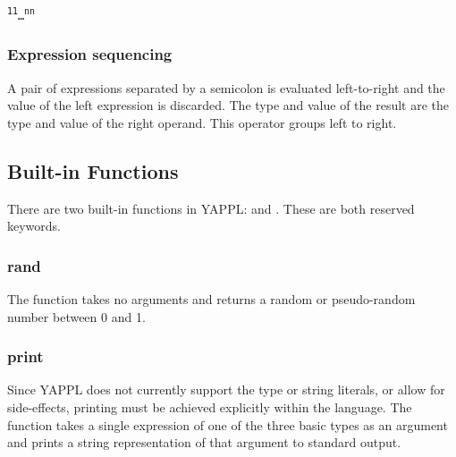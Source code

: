 \begin{alltt}
\quad {}   \textsuperscript{1} \term{->} \textsuperscript{1} \term{|} \dots \term{|} \textsuperscript{n} \term{->} \textsuperscript{n}
\end{alltt}

\subsubsection{Expression sequencing}
A pair of expressions separated by a semicolon is evaluated left-to-right and the value of the left expression is discarded. The type and value of the result are the type and value of the right operand. This operator groups left to right.
\begin{alltt}
\quad {} \term{;} 
\end{alltt}

\subsection{Built-in Functions}
There are two built-in functions in YAPPL:  and . These are both reserved keywords. 
\subsubsection{rand}
The function  takes no arguments and returns a random or pseudo-random number between 0 and 1. 

\subsubsection{print}
Since YAPPL does not currently support the  type or string literals, or allow for side-effects, printing must be achieved explicitly within the language. The  function takes a single expression of one of the three basic types as an argument and prints a string representation of that argument to standard output. 


